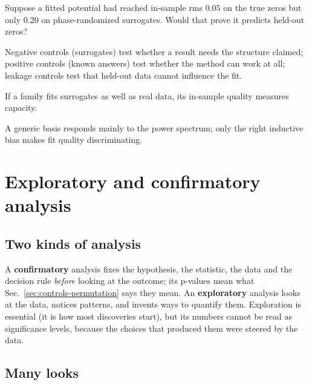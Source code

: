 \begin{checkpoint}
Suppose a fitted potential had reached in-sample rms $0.05$ on the true zeros but only $0.20$ on phase-randomized surrogates. Would that prove it predicts held-out zeros?
\end{checkpoint}

\begin{keyideas}
\item Negative controls (surrogates) test whether a result needs the structure claimed; positive controls (known answers) test whether the method can work at all; leakage controls test that held-out data cannot influence the fit.
\item If a family fits surrogates as well as real data, its in-sample quality measures capacity.
\item A generic basis responds mainly to the power spectrum; only the right inductive bias makes fit quality discriminating.
\end{keyideas}

\section{Exploratory and confirmatory analysis}\label{sec:controls-posthoc}

\subsection{Two kinds of analysis}

A \textbf{confirmatory} analysis fixes the hypothesis, the statistic, the data and the decision rule \emph{before} looking at the outcome; its p-values mean what Sec.~\ref{sec:controls-permutation} says they mean. An \textbf{exploratory} analysis looks at the data, notices patterns, and invents ways to quantify them. Exploration is essential (it is how most discoveries start), but its numbers cannot be read as significance levels, because the choices that produced them were steered by the data.

\subsection{Many looks}

